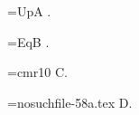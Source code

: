 \documentclass{article}
\newif\ifup \uptrue
\def\eq{=}
\begin{document}
\setbox\boxa\ifup=\hbox{Up}\fi A \box\boxa.

\setbox\boxb\eq\hbox{Eq}B \box\boxb.

\font\myfont\eq cmr10 {\myfont C}.

\openin\inp\eq nosuchfile-58a.tex \ifeof\inp D\fi.
\end{document}
